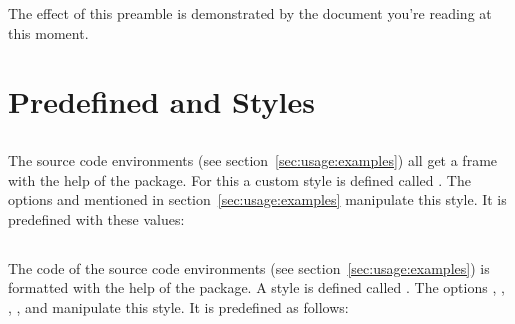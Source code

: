 \documentclass[load-preamble]{cnltx-doc}
\begin{document}
The effect of this preamble is demonstrated by the document you're reading at
this moment.

\section{Predefined  and  Styles}

\subsection{}

The source code environments (see section~\ref{sec:usage:examples}) all get a
frame with the help of the  package.  For this a custom style is
defined called .  The options  and
 mentioned in section~\ref{sec:usage:examples}
manipulate this style.  It is predefined with these values:


\subsection{}

The code of the source code environments (see
section~\ref{sec:usage:examples}) is formatted with the help of the
 package.  A  style is defined called
.  The options , ,
, ,  and
 manipulate this style.  It is predefined as
follows:
\end{document}
